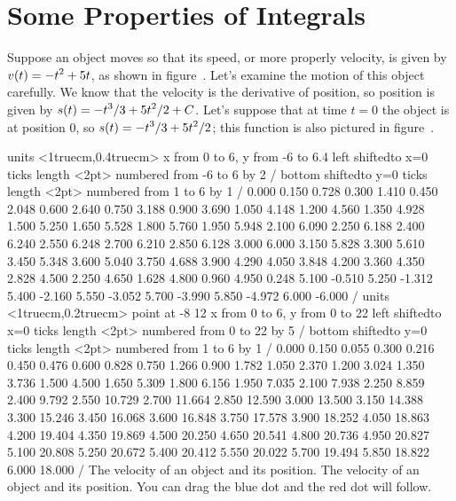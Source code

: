 \section{Some Properties of Integrals}{}{}
\nobreak
Suppose an object moves so that its speed, or more properly velocity,
is given by $\displaystyle v(t)=-t^2+5t$, as shown in figure~. Let's examine the motion of this object carefully. We know
that the velocity is the derivative of position, so position is 
given by $\displaystyle s(t)=-t^3/3+5t^2/2+C$. Let's suppose that at time $t=0$ the
object is at position 0, so $\displaystyle s(t)=-t^3/3+5t^2/2$; this function is
also pictured in figure~.

\figure
\texonly
\vbox{\beginpicture
\normalgraphs
\ninepoint
\setcoordinatesystem units <1truecm,0.4truecm>
\setplotarea x from 0 to 6, y from -6 to 6.4
\axis left shiftedto x=0 ticks length <2pt> numbered from -6 to 6 by 2 /
\axis bottom shiftedto y=0 ticks length <2pt> numbered from 1 to 6 by 1 /
\setquadratic
{} 0.000 0.150 0.728 0.300 1.410 0.450 2.048 0.600 2.640 
0.750 3.188 0.900 3.690 1.050 4.148 1.200 4.560 1.350 4.928 
1.500 5.250 1.650 5.528 1.800 5.760 1.950 5.948 2.100 6.090 
2.250 6.188 2.400 6.240 2.550 6.248 2.700 6.210 2.850 6.128 
3.000 6.000 3.150 5.828 3.300 5.610 3.450 5.348 3.600 5.040 
3.750 4.688 3.900 4.290 4.050 3.848 4.200 3.360 4.350 2.828 
4.500 2.250 4.650 1.628 4.800 0.960 4.950 0.248 5.100 -0.510 
5.250 -1.312 5.400 -2.160 5.550 -3.052 5.700 -3.990 5.850 -4.972 
6.000 -6.000  /
\setcoordinatesystem units <1truecm,0.2truecm> point at -8 12
\setplotarea x from 0 to 6, y from 0 to 22
\axis left shiftedto x=0 ticks length <2pt> numbered from 0 to 22 by 5 /
\axis bottom shiftedto y=0 ticks length <2pt> numbered from 1 to 6 by 1 /
\setquadratic
{} 0.000 0.150 0.055 0.300 0.216 0.450 0.476 0.600 0.828 
0.750 1.266 0.900 1.782 1.050 2.370 1.200 3.024 1.350 3.736 
1.500 4.500 1.650 5.309 1.800 6.156 1.950 7.035 2.100 7.938 
2.250 8.859 2.400 9.792 2.550 10.729 2.700 11.664 2.850 12.590 
3.000 13.500 3.150 14.388 3.300 15.246 3.450 16.068 3.600 16.848 
3.750 17.578 3.900 18.252 4.050 18.863 4.200 19.404 4.350 19.869 
4.500 20.250 4.650 20.541 4.800 20.736 4.950 20.827 5.100 20.808 
5.250 20.672 5.400 20.412 5.550 20.022 5.700 19.494 5.850 18.822 
6.000 18.000  /
\endpicture}
\begincaption
The velocity of an object and its position.
\endcaption
\endtexonly
{}
\begincaption
The velocity of an object and its position. You can drag the blue dot
and the red dot will follow.
\endcaption
\endfigure

